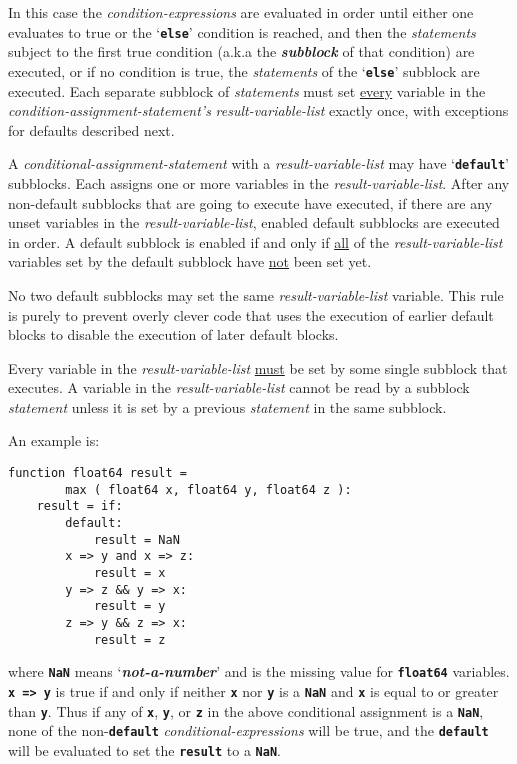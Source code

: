 \documentclass[12pt]{article}
\makeatletter
\newcommand{\TT}[1]{{\tt \bfseries #1}}
\newcommand{\key}[1]{{\bf \em #1}\index{#1}}
\newcommand{\ttkey}[1]{\TT{#1}\index{#1@{\tt #1}}}
\newenvironment{indpar}[1][0.3in]%
	{\begin{list}{}%
		     {\setlength{\itemsep}{0in}%
		      \setlength{\topsep}{0in}%
		      \setlength{\parsep}{1ex}%
		      \setlength{\labelwidth}{#1}%
		      \setlength{\leftmargin}{#1}%
		      \addtolength{\leftmargin}{\labelsep}}%
	 \item}%
	{\end{list}}
\makeatother
\begin{document}
In this case the {\em condition-expressions} are evaluated in order
until either one evaluates to true or the `\TT{else}' condition is
reached, and then the {\em statements} subject to the
first true condition (a.k.a the \key{subblock} of that condition)
are executed, or if no condition is true, the {\em statements}
of the `\TT{else}' subblock are executed.  Each separate subblock of
{\em statements} must set \underline{every} variable
in the {\em condition-assignment-statement's} {\em result-variable-list} exactly
once, with exceptions for defaults described next.

A {\em conditional-assignment-statement} with a
{\em result-variable-list} may have
`\ttkey{default}\TT{:}' subblocks.  Each assigns one or more
variables in the {\em result-variable-list}.  After any non-default subblocks
that are going to execute have executed, if there are any unset
variables in the {\em result-variable-list},
enabled default subblocks are executed
in order.  A default subblock is enabled if and
only if \underline{all} of the
{\em result-variable-list} variables set by the default subblock have
\underline{not} been set yet.

No two default subblocks may set the same {\em result-variable-list}
variable.  This rule is purely to prevent overly clever code that
uses the execution of earlier default blocks to disable the
execution of later default blocks.

Every variable in the {\em result-variable-list} \underline{must} be set by some
single subblock that executes.  A variable in the
{\em result-variable-list} cannot be read by a subblock {\em statement}
unless it is set by a previous {\em statement} in the
same subblock.

An example is:
\begin{indpar}\begin{verbatim}
function float64 result =
        max ( float64 x, float64 y, float64 z ):
    result = if:
        default:
            result = NaN
        x => y and x => z:
            result = x
        y => z && y => x:
            result = y
        z => y && z => x:
            result = z
\end{verbatim}\end{indpar}

where \TT{NaN} means `\key{not-a-number}' and is the missing
value for \TT{float64} variables.  \TT{x~=>~y} is true if
and only if neither \TT{x} nor \TT{y} is a \TT{NaN} and
\TT{x} is equal to or greater than \TT{y}.  Thus if any of
\TT{x}, \TT{y}, or \TT{z} in the above conditional assignment
is a \TT{NaN}, none of the non-\TT{default} {\em conditional-expressions}
will be true, and the \TT{default} will be evaluated to set
the \TT{result} to a \TT{NaN}.
\end{document}
